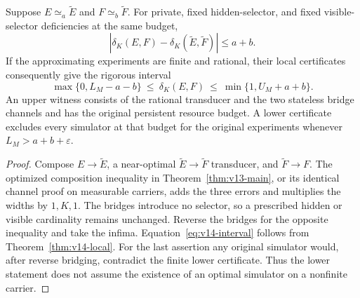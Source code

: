 \begin{theorem}
\label{thm:v14-stability}
Suppose $E\simeq_a\widetilde E$ and
$F\simeq_b\widetilde F$. For private, fixed hidden-selector, and fixed
visible-selector deficiencies at the same budget,
\begin{equation}\label{eq:v14-stability}
 |\delta_K(E,F)-\delta_K(\widetilde E,\widetilde F)|\le a+b.
\end{equation}
If the approximating experiments are finite and rational, their local
certificates consequently give the rigorous interval
\begin{equation}\label{eq:v14-interval}
 \max\{0,L_M-a-b\}\ \le\ \delta_K(E,F)\ \le\
       \min\{1,U_M+a+b\}.
\end{equation}
An upper witness consists of the rational transducer and the two
stateless bridge channels and has the original persistent resource
budget. A lower certificate excludes every simulator at that budget
for the original experiments whenever $L_M>a+b+\varepsilon$.
\end{theorem}
\begin{proof}
Compose $E\to\widetilde E$, a near-optimal
$\widetilde E\to\widetilde F$ transducer, and
$\widetilde F\to F$. The optimized composition inequality in
Theorem~\ref{thm:v13-main}, or its identical channel proof on measurable
carriers, adds the three errors and multiplies the widths by $1,K,1$.
The bridges introduce no selector, so a prescribed hidden or visible
cardinality remains unchanged. Reverse the bridges for the opposite
inequality and take the infima. Equation~\eqref{eq:v14-interval} follows
from Theorem~\ref{thm:v14-local}. For the last assertion any original
simulator would, after reverse bridging, contradict the finite lower
certificate. Thus the lower statement does not assume the existence of
an optimal simulator on a nonfinite carrier.
\end{proof}
